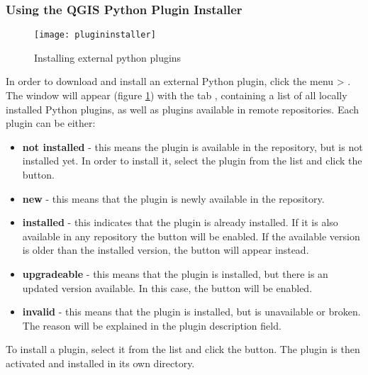 \subsubsection{Using the QGIS Python Plugin Installer}\label{sec:python_plugin_installer}

\begin{figure}[ht]
   \begin{center}
   \caption{Installing external python plugins \nixcaption}
\label{fig:plugininstaller}\smallskip
   \texttt{[image: plugininstaller]}
\end{center}
\end{figure}

In order to download and install an external Python plugin, click the 
menu  > . The  window will appear 
(figure \ref{fig:plugininstaller}) with the tab , containing 
a list of all locally installed Python plugins, as well as plugins 
available in remote repositories. Each plugin can be either:
\begin{itemize}
\item \textbf{not installed} - this means the plugin is available in the repository, but is not installed yet. In order to install it, select the plugin from the list and click the  button.
\item \textbf{new} - this means that the plugin is newly available in the repository.
\item \textbf{installed} - this indicates that the plugin is already installed. If it is also available in any repository the  button will be enabled. If the available version is older than the installed version, the  button will appear instead.
\item \textbf{upgradeable} - this means that the plugin is installed, but there is an updated version available. In this case, the  button will be enabled.
\item \textbf{invalid} - this means that the plugin is installed, but is unavailable or broken. The reason will be explained in the plugin description field.
\end{itemize}


To install a plugin, select it from the list and click the  
button. The plugin is then activated and installed in its own directory. 

